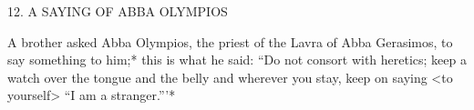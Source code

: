 12. A SAYING OF ABBA OLYMPIOS

A brother asked Abba Olympios, the priest of the Lavra of Abba
Gerasimos, to say something to him;* this is what he said: “Do not
consort with heretics; keep a watch over the tongue and the belly
and wherever you stay, keep on saying <to yourself> “I am a
stranger.”'*

